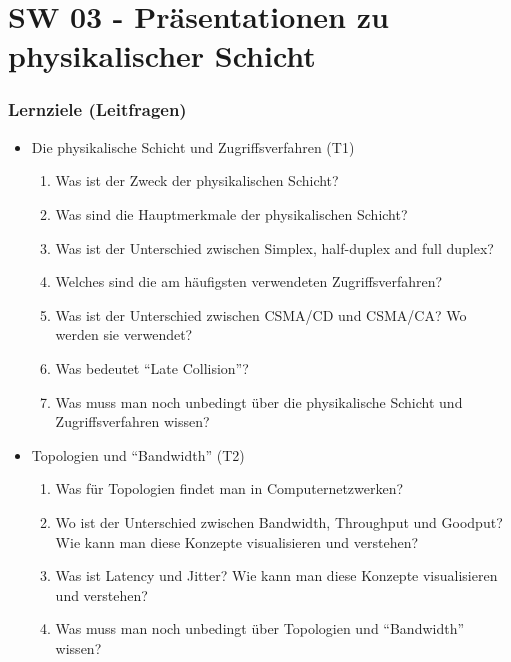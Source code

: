 \part{SW 03 - Präsentationen zu physikalischer Schicht}
\section{Lernziele (Leitfragen)}
\begin{itemize}
    \item Die physikalische Schicht und Zugriffsverfahren (T1)
    \begin{enumerate}
        \item Was ist der Zweck der physikalischen Schicht?
        \item Was sind die Hauptmerkmale der physikalischen Schicht?
        \item Was ist der Unterschied zwischen \flqq{}Simplex\frqq, \flqq{}half-duplex\frqq{} and \flqq{}full duplex\frqq?
        \item Welches sind die am häufigsten verwendeten Zugriffsverfahren?
        \item Was ist der Unterschied zwischen CSMA/CD und CSMA/CA? Wo werden sie verwendet?
        \item Was bedeutet "`Late Collision"'?
        \item Was muss man noch unbedingt über die physikalische Schicht und Zugriffsverfahren wissen?\\
    \end{enumerate}

    \item Topologien und "`Bandwidth"' (T2)
    \begin{enumerate}
        \item Was für Topologien findet man in Computernetzwerken?
        \item Wo ist der Unterschied zwischen \flqq{}Bandwidth\frqq, \flqq{}Throughput\frqq{} und \flqq{}Goodput\frqq? Wie kann man diese Konzepte visualisieren und verstehen?
        \item Was ist \flqq{}Latency\frqq{} und \flqq{}Jitter\frqq? Wie kann man diese Konzepte visualisieren und verstehen?
        \item Was muss man noch unbedingt über Topologien und "`Bandwidth"' wissen?\\
    \end{enumerate}


\end{itemize}
